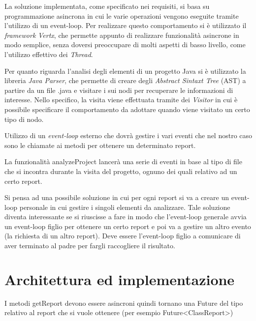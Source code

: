 La soluzione implementata, come specificato nei requisiti, si basa su programmazione asincrona in cui le varie operazioni vengono eseguite tramite l'utilizzo di un event-loop.
%
Per realizzare questo comportamento si è utilizzato il \textit{framework} \textit{Vertx}, che permette appunto di realizzare funzionalità asincrone in modo semplice, senza doversi preoccupare di molti aspetti di basso livello, come l'utilizzo effettivo dei \textit{Thread}.

Per quanto riguarda l'analisi degli elementi di un progetto Java si è utilizzato la libreria \textit{Java Parser}, che permette di creare degli \textit{Abstract Sintaxt Tree} (AST) a partire da un file .java e visitare i sui nodi per recuperare le informazioni di interesse.
%
Nello specifico, la visita viene effettuata tramite dei \textit{Visitor} in cui è possibile specificare il comportamento da adottare quando viene visitato un certo tipo di nodo.

Utilizzo di un \textit{event-loop} esterno che dovrà gestire i vari eventi che nel nostro caso sono le chiamate ai metodi per ottenere un determinato report.

La funzionalità analyzeProject lancerà una serie di eventi in base al tipo di file che si incontra durante la visita del progetto, ognuno dei quali relativo ad un certo report.

Si pensa ad una possibile soluzione in cui per ogni report si va a creare un event-loop personale in cui gestire i singoli elementi da analizzare. Tale soluzione diventa interessante se si riuscisse a fare in modo che l'event-loop generale avvia un event-loop figlio per ottenere un certo report e poi va a gestire un altro evento (la richiesta di un altro report). Deve essere l'event-loop figlio a comunicare di aver terminato al padre per fargli raccogliere il risultato. 

\section{Architettura ed implementazione}

I metodi getReport devono essere asincroni quindi tornano una Future del tipo relativo al report che si vuole ottenere (per esempio Future<ClassReport>)